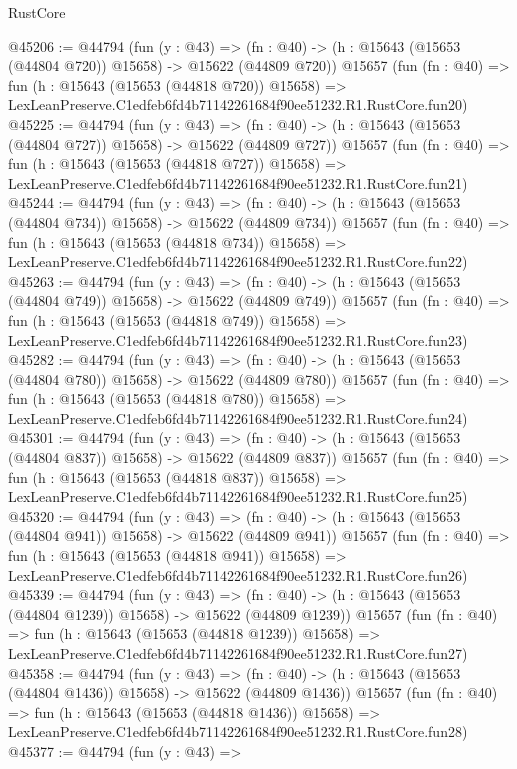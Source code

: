\begin{lexlean}{RustCore}
\begin{coremodule}
@45206 := @44794
    (fun (y : @43) =>
    (fn : @40) -> (h : @15643 (@15653 (@44804 @720)) @15658) -> @15622 (@44809 @720))
    @15657
    (fun (fn : @40) =>
    fun (h : @15643 (@15653 (@44818 @720)) @15658) =>
    LexLeanPreserve.C1edfeb6fd4b71142261684f90ee51232.R1.RustCore.fun20)
@45225 := @44794
    (fun (y : @43) =>
    (fn : @40) -> (h : @15643 (@15653 (@44804 @727)) @15658) -> @15622 (@44809 @727))
    @15657
    (fun (fn : @40) =>
    fun (h : @15643 (@15653 (@44818 @727)) @15658) =>
    LexLeanPreserve.C1edfeb6fd4b71142261684f90ee51232.R1.RustCore.fun21)
@45244 := @44794
    (fun (y : @43) =>
    (fn : @40) -> (h : @15643 (@15653 (@44804 @734)) @15658) -> @15622 (@44809 @734))
    @15657
    (fun (fn : @40) =>
    fun (h : @15643 (@15653 (@44818 @734)) @15658) =>
    LexLeanPreserve.C1edfeb6fd4b71142261684f90ee51232.R1.RustCore.fun22)
@45263 := @44794
    (fun (y : @43) =>
    (fn : @40) -> (h : @15643 (@15653 (@44804 @749)) @15658) -> @15622 (@44809 @749))
    @15657
    (fun (fn : @40) =>
    fun (h : @15643 (@15653 (@44818 @749)) @15658) =>
    LexLeanPreserve.C1edfeb6fd4b71142261684f90ee51232.R1.RustCore.fun23)
@45282 := @44794
    (fun (y : @43) =>
    (fn : @40) -> (h : @15643 (@15653 (@44804 @780)) @15658) -> @15622 (@44809 @780))
    @15657
    (fun (fn : @40) =>
    fun (h : @15643 (@15653 (@44818 @780)) @15658) =>
    LexLeanPreserve.C1edfeb6fd4b71142261684f90ee51232.R1.RustCore.fun24)
@45301 := @44794
    (fun (y : @43) =>
    (fn : @40) -> (h : @15643 (@15653 (@44804 @837)) @15658) -> @15622 (@44809 @837))
    @15657
    (fun (fn : @40) =>
    fun (h : @15643 (@15653 (@44818 @837)) @15658) =>
    LexLeanPreserve.C1edfeb6fd4b71142261684f90ee51232.R1.RustCore.fun25)
@45320 := @44794
    (fun (y : @43) =>
    (fn : @40) -> (h : @15643 (@15653 (@44804 @941)) @15658) -> @15622 (@44809 @941))
    @15657
    (fun (fn : @40) =>
    fun (h : @15643 (@15653 (@44818 @941)) @15658) =>
    LexLeanPreserve.C1edfeb6fd4b71142261684f90ee51232.R1.RustCore.fun26)
@45339 := @44794
    (fun (y : @43) =>
    (fn : @40) -> (h : @15643 (@15653 (@44804 @1239)) @15658) -> @15622 (@44809 @1239))
    @15657
    (fun (fn : @40) =>
    fun (h : @15643 (@15653 (@44818 @1239)) @15658) =>
    LexLeanPreserve.C1edfeb6fd4b71142261684f90ee51232.R1.RustCore.fun27)
@45358 := @44794
    (fun (y : @43) =>
    (fn : @40) -> (h : @15643 (@15653 (@44804 @1436)) @15658) -> @15622 (@44809 @1436))
    @15657
    (fun (fn : @40) =>
    fun (h : @15643 (@15653 (@44818 @1436)) @15658) =>
    LexLeanPreserve.C1edfeb6fd4b71142261684f90ee51232.R1.RustCore.fun28)
@45377 := @44794
    (fun (y : @43) =>

\end{coremodule}
\end{lexlean}
